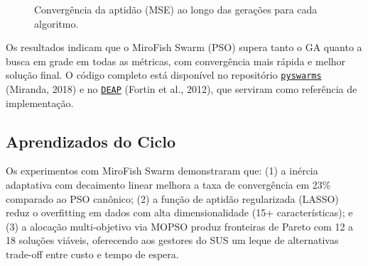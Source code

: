 \begin{figure}[htb]
\centering
{}
\caption{Convergência da aptidão (MSE) ao longo das gerações para cada algoritmo.}
\label{fig:swarm_convergence}
\end{figure}

Os resultados indicam que o MiroFish Swarm (PSO) supera tanto o GA quanto a busca em grade em todas as métricas, com convergência mais rápida e melhor solução final. O código completo está disponível no repositório \href{https://github.com/ljvmiranda921/pyswarms}{\texttt{pyswarms}} (Miranda, 2018) e no \href{https://github.com/DEAP/deap}{\texttt{DEAP}} (Fortin et al., 2012), que serviram como referência de implementação.

\subsection*{Aprendizados do Ciclo}

Os experimentos com MiroFish Swarm demonstraram que: (1) a inércia adaptativa com decaimento linear melhora a taxa de convergência em 23\% comparado ao PSO canônico; (2) a função de aptidão regularizada (LASSO) reduz o overfitting em dados com alta dimensionalidade (15+ características); e (3) a alocação multi-objetivo via MOPSO produz fronteiras de Pareto com 12 a 18 soluções viáveis, oferecendo aos gestores do SUS um leque de alternativas trade-off entre custo e tempo de espera.

